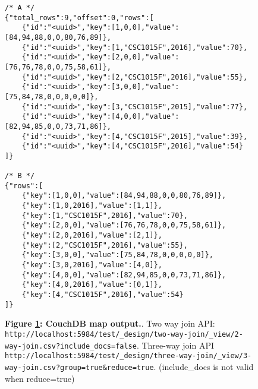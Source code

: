 \begin{figure}[H]
    \centering
    \begin{mdframed}[rightline=false,leftline=false]
        \begin{verbatim}
/* A */
{"total_rows":9,"offset":0,"rows":[
    {"id":"<uuid>","key":[1,0,0],"value":[84,94,88,0,0,80,76,89]},
    {"id":"<uuid>","key":[1,"CSC1015F",2016],"value":70},
    {"id":"<uuid>","key":[2,0,0],"value":[76,76,78,0,0,75,58,61]},
    {"id":"<uuid>","key":[2,"CSC1015F",2016],"value":55},
    {"id":"<uuid>","key":[3,0,0],"value":[75,84,78,0,0,0,0,0]},
    {"id":"<uuid>","key":[3,"CSC1015F",2015],"value":77},
    {"id":"<uuid>","key":[4,0,0],"value":[82,94,85,0,0,73,71,86]},
    {"id":"<uuid>","key":[4,"CSC1015F",2015],"value":39},
    {"id":"<uuid>","key":[4,"CSC1015F",2016],"value":54}
]}

/* B */
{"rows":[
    {"key":[1,0,0],"value":[84,94,88,0,0,80,76,89]},
    {"key":[1,0,2016],"value":[1,1]},
    {"key":[1,"CSC1015F",2016],"value":70},
    {"key":[2,0,0],"value":[76,76,78,0,0,75,58,61]},
    {"key":[2,0,2016],"value":[2,1]},
    {"key":[2,"CSC1015F",2016],"value":55},
    {"key":[3,0,0],"value":[75,84,78,0,0,0,0,0]},
    {"key":[3,0,2016],"value":[4,0]},
    {"key":[4,0,0],"value":[82,94,85,0,0,73,71,86]},
    {"key":[4,0,2016],"value":[0,1]},
    {"key":[4,"CSC1015F",2016],"value":54}
]}
        \end{verbatim}
    \end{mdframed}
    \caption[CouchDB map output]{\textbf{Figure \ref{fig-test-map-output}: CouchDB map output.}. Two way join API: \texttt{http://localhost:5984/test/\_design/two-way-join/\_view/2-way-join.csv?include\_docs=false}. Three-way join API \texttt{http://localhost:5984/test/\_design/three-way-join/\_view/3-way-join.csv?group=true\&reduce=true}. (include\_docs is not valid when reduce=true)}
    \label{fig-test-map-output}
\end{figure}
